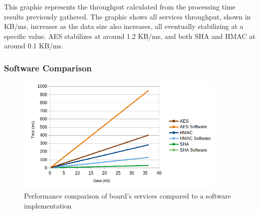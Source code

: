 This graphic represents the throughput calculated from the processing time results previously gathered. The graphic shows all services throughput, shown in KB/ms, increases as the data size also increases, all eventually stabilizing at a specific value. \ac{AES} stabilizes at around 1.2 KB/ms, and both \ac{SHA} and \ac{HMAC} at around 0.1 KB/ms.

\subsubsection{Software Comparison}\label{chap:evaluation:services:software}





\begin{figure}[h!]
	\centering
	\includegraphics[width=0.9\textwidth]{./Images/software-core-time.png}
	\caption{Performance comparison of board's services compared to a software implementation}
	\label{fig:performance:software-core-time}
\end{figure}

